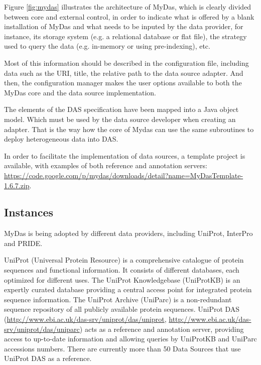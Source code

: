 Figure \ref{fig:mydas} illustrates the architecture of MyDas, which is clearly divided between core and external control, in order to indicate what is offered by a blank installation of MyDas and what needs to be inputed by the data provider, for instance, its storage system (e.g. a relational database or flat file),  the strategy used to query the data (e.g. in-memory or using pre-indexing), etc.

Most of this information should be described in the configuration file, including data such as the URI, title, the relative path to the data source adapter. And then, the configuration manager makes the user options available to both the MyDas core and the data source implementation. 

The elements of the DAS specification have been mapped into a Java object model. Which must be used by the data source developer when creating an adapter. That is the way how the core of Mydas can use the same subroutines to deploy heterogeneous data into DAS. 

In order to facilitate the implementation of data sources, a template project is available, with examples of both reference and annotation servers: \url{https://code.google.com/p/mydas/downloads/detail?name=MyDasTemplate-1.6.7.zip}.

\subsection{Instances}
MyDas is being adopted by different data providers, including UniProt, InterPro and PRIDE.

UniProt (Universal Protein Resource)\cite{UNI2011} is a comprehensive catalogue of protein sequences and functional information. It consists of different databases, each optimized for different uses. The UniProt Knowledgebase (UniProtKB) is an expertly curated database providing a central access point for integrated protein sequence information. The UniProt Archive (UniParc) is a non-redundant sequence repository of all publicly available protein sequences. UniProt DAS (\url{http://www.ebi.ac.uk/das-srv/uniprot/das/uniprot}, \url{http://www.ebi.ac.uk/das-srv/uniprot/das/uniparc}) acts as a reference and annotation server, providing access to up-to-date information and allowing queries by UniProtKB and UniParc accessions numbers. There are currently more than 50 Data Sources that use UniProt DAS as a reference.

